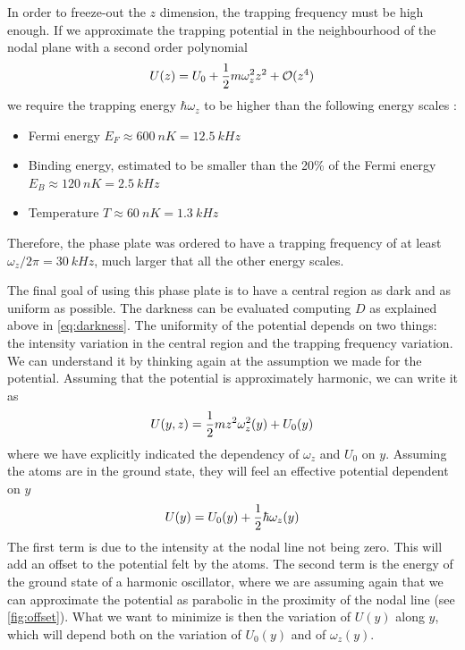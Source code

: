 In order to freeze-out the $z$ dimension, the trapping frequency must be high enough. If we approximate the trapping potential in the neighbourhood of the nodal plane with a second order polynomial
\begin{equation}
    \label{eq:trapping_frequency}
    U(z) = U_0 + \frac{1}{2} m \omega_z^2 z^2 + \mathcal{O}(z^4)
\end{equation}
we require the trapping energy $\hbar \omega_z$ to be higher than the following energy scales \cite{schmidt2021}:
\begin{itemize}
    \item Fermi energy $E_F \approx \SI{600}{nK} = \SI{12.5}{kHz}$
    \item Binding energy, estimated to be smaller than the 20\% of the Fermi energy $E_B \approx \SI{120}{nK} = \SI{2.5}{kHz}$
    \item Temperature $T \approx \SI{60}{nK} = \SI{1.3}{kHz}$
\end{itemize}
Therefore, the phase plate was ordered to have a trapping frequency of at least $\omega_z / 2\pi = \SI{30}{kHz}$, much larger that all the other energy scales.

The final goal of using this phase plate is to have a central region as dark and as uniform as possible. The darkness can be evaluated computing $D$ as explained above in \cref{eq:darkness}. The uniformity of the potential depends on two  things: the intensity variation in the central region and the trapping frequency variation. We can understand it by thinking again at the assumption we made for the potential.
Assuming that the potential is approximately harmonic, we can write it as
\begin{equation}
    U(y,z) = \frac{1}{2} m z^2\omega_z^2(y) + U_0(y)
\end{equation}
where we have explicitly indicated the dependency of $\omega_z$ and $U_0$ on $y$. Assuming the atoms are in the ground state, they will feel an effective potential dependent on $y$
\begin{equation}
    \label{eq:effectivr_potential}
    U(y) = U_0(y) + \frac{1}{2} \hbar \omega_z(y)
\end{equation}
The first term is due to the intensity at the nodal line not being zero. This will add an offset to the potential felt by the atoms. The second term is the energy of the ground state of a harmonic oscillator, where we are assuming again that we can approximate the potential as parabolic in the proximity of the nodal line (see \cref{fig:offset}). What we want to minimize is then the variation of $U(y)$ along $y$, which will depend both on the variation of $U_0(y)$ and of  $\omega_z(y)$.

